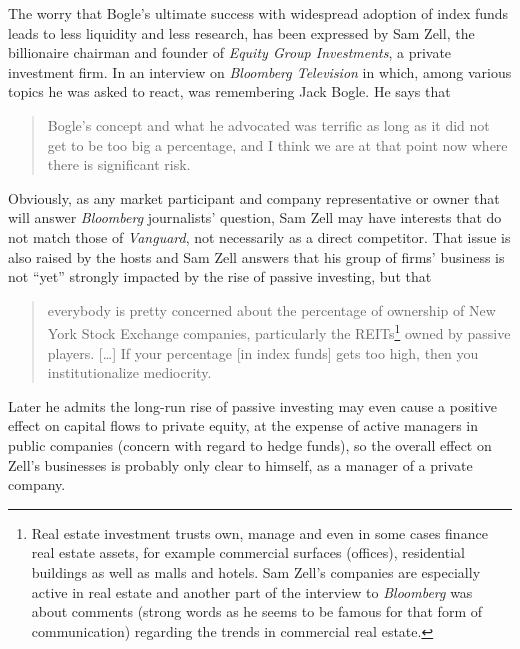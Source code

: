 The worry that Bogle's ultimate success with widespread adoption of index funds leads to less liquidity and less research, has been expressed by Sam Zell, the billionaire chairman and founder of \textit{Equity Group Investments}, a private investment firm. In an interview on \textit{Bloomberg Television} in which, among various topics he was asked to react, was remembering Jack Bogle. He says that
\begin{quotation}
Bogle's concept and what he advocated was terrific as long as it did not get to be too big a percentage, and I think we are at that point now where there is significant risk.
\end{quotation}
Obviously, as any market participant and company representative or owner that will answer \textit{Bloomberg} journalists' question, Sam Zell may have interests that do not match those of \textit{Vanguard}, not necessarily as a direct competitor. That issue is also raised by the hosts and Sam Zell answers that his group of firms' business is not ``yet'' strongly impacted by the rise of passive investing, but that
\begin{quotation}
everybody is pretty concerned about the percentage of ownership of New York Stock Exchange companies, particularly the REITs\footnote{Real estate investment trusts own, manage and even in some cases finance real estate assets, for example commercial surfaces (offices), residential buildings as well as malls and hotels. Sam Zell's companies are especially active in real estate and another part of the interview to \textit{Bloomberg} was about comments (strong words as he seems to be famous for that form of communication) regarding the trends in commercial real estate.} owned by passive players. [\ldots] If your percentage [in index funds] gets too high, then you institutionalize mediocrity.
\end{quotation}
Later he admits the long-run rise of passive investing may even cause a positive effect on capital flows to private equity, at the expense of active managers in public companies (concern with regard to hedge funds), so the overall effect on Zell's businesses is probably only clear to himself, as a manager of a private company. 

